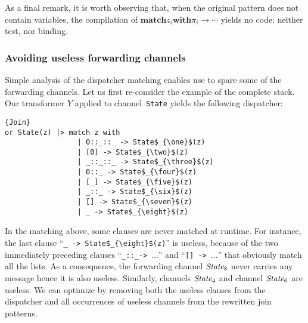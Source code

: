 \documentclass{LMCS}
\let \lst \lstinline
\newcommand{\pt}{\pi}
\newcommand{\kwd}[1]{\ensuremath{\mathbf{#1}}}
\newcommand{\prefix}[1]{\mathopen{}\mathrel{\kwd {#1}}}
\newcommand{\infix}[1]{\mathrel{\kwd {#1}}}
\newcommand{\id}[1]{\textit{#1}}
\renewcommand{\_}{\mathord{\rule[-.25ex]{1ex}{.15ex}}}
\newcommand{\matchone}[3]{\prefix{match} #1 \infix{with} #2
  \rightarrow #3}
\begin{document}
As a final remark, it is worth observing that, when the original
pattern does not contain variables, the compilation of
$\matchone{z_i}{\pt_i}{\cdots}$ yields no code: neither test, nor
binding.

\subsubsection{Avoiding useless forwarding channels}
\label{subsubsec.remove}
Simple analysis of the dispatcher matching enables use to spare some
of the forwarding channels.  Let us first re-consider the example of
the complete stack. Our transformer $Y$ applied to channel~\lst|State|
yields the following dispatcher:
\begin{lstlisting}{Join}
or State(z) |> match z with
                 | 0::_::_ -> State$_{\one}$(z)
                 | [0] -> State$_{\two}$(z)
                 | _::_::_ -> State$_{\three}$(z)
                 | 0::_ -> State$_{\four}$(z)
                 | [_] -> State$_{\five}$(z)
                 | _::_ -> State$_{\six}$(z)
                 | [] -> State$_{\seven}$(z)
                 | _ -> State$_{\eight}$(z)
\end{lstlisting}
In the matching above, some clauses are never matched at runtime.  For
instance, the last clause ``\lst|_ -> State$_{\eight}$(z)|'' is
useless, because of the two immediately preceding clauses
``\lst"_::_->"~$\ldots$'' and ``\lst"[] ->"~$\ldots$'' that obviously
match all the lists.  As a consequence, the forwarding channel
$\id{State}_{\eight}$ never carries any message hence it is also
useless.  Similarly, channels $\id{State}_{\four}$ and channel
$\id{State}_{\six}$ are useless. We can optimize by removing both the
useless clauses from the dispatcher and all occurrences of useless
channels from the rewritten join patterns.
\end{document}
